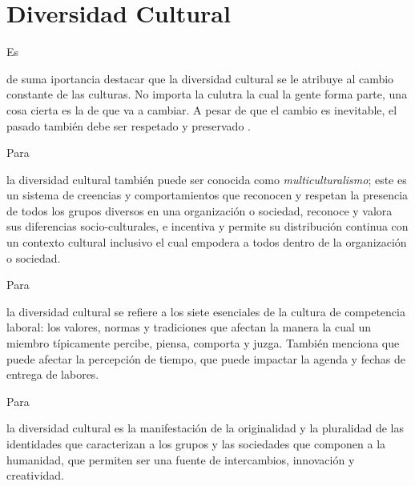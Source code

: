 \documentclass[stu, 12pt, letterpaper, donotrepeattitle, floatsintext, natbib]{apa7}
\begin{document}
\section{Diversidad Cultural}
Es \begin{justifying}
    de suma iportancia destacar que la diversidad cultural se le atribuye al cambio constante de las culturas. No importa la culutra la cual la gente forma parte, una cosa cierta
    es la de que va a cambiar. A pesar de que el cambio es inevitable, el pasado también debe ser respetado y preservado \citep{zimmermann-2017} . %
\end{justifying}
Para \begin{justifying}
    \cite{belfield-2012} %
    la diversidad cultural también puede ser conocida como \emph{multiculturalismo}; este es un sistema de creencias y comportamientos que reconocen y respetan la presencia de todos los grupos diversos en
    una organización o sociedad, reconoce y valora sus diferencias socio-culturales, e incentiva y permite su distribución continua con
    un contexto cultural inclusivo el cual empodera a todos dentro de la organización o sociedad.\par
\end{justifying}
Para \begin{justifying}
    \cite{alpert-2021} %
    la diversidad cultural se refiere a los siete esenciales de la cultura de competencia laboral: los valores, normas y tradiciones que afectan la manera la cual un miembro
    típicamente percibe, piensa, comporta y juzga. También menciona que puede afectar la percepción de tiempo, que puede impactar la agenda y fechas de entrega de labores.\par
\end{justifying}
Para \begin{justifying}
    \cite{romero-2021} %
    la diversidad cultural es la manifestación de la originalidad y la pluralidad de las identidades que caracterizan a los grupos y las sociedades que componen a la humanidad, que permiten ser
    una fuente de intercambios, innovación y creatividad.\par
\end{justifying}
\vspace{\baselineskip}
\end{document}
